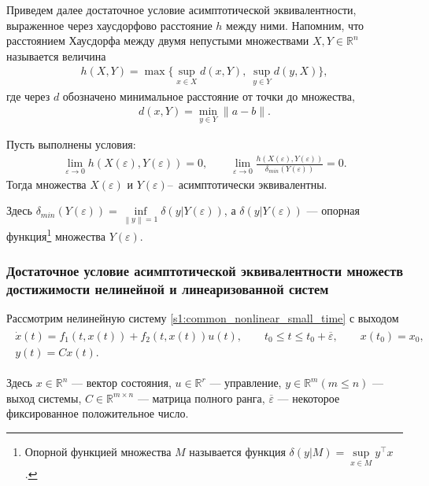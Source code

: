 \documentclass[../main.tex]{subfiles}
\begin{document}
Приведем далее достаточное условие асимптотической эквивалентности, выраженное через хаусдорфово расстояние $ h $ между ними. 
Напомним, что расстоянием Хаусдорфа между двумя непустыми множествами $X, Y \in \mathbb{R}^n$ называется величина 
\begin{gather*}
	h(X,Y) = \max\Big\{ \sup\limits_{x \in X} d(x, Y), \ \sup\limits_{y \in Y} d(y, X) \Big\},
\end{gather*}
где через $d$ обозначено минимальное расстояние от точки до множества, 
\begin{gather*}
	d(x, Y) = \min\limits_{y \in Y} \| a - b\|.
\end{gather*} 
\begin{theorem}\label{suff}\cite{GusevUMJ}
 Пусть выполнены условия:
 \begin{gather*}
 \lim\limits_{\varepsilon \rightarrow 0}h(X(\varepsilon),Y(\varepsilon)) = 0, \qquad \lim\limits_{\varepsilon \rightarrow 0}\frac{h(X(\varepsilon),Y(\varepsilon))}{\delta_{min}(Y(\varepsilon))} = 0.
 \end{gather*}
 Тогда множества $ X(\varepsilon) $ и $ Y(\varepsilon) $\---~асимптотически эквивалентны. 
 
 Здесь $ \delta_{min}(Y(\varepsilon)) = \inf\limits_{\left\|y \right\| =1 } \delta(y|Y(\varepsilon))$, а $ \delta(y|Y(\varepsilon)) $ --- опорная функция\footnote{
 Опорной функцией множества $M$ называется функция $\delta(y|M) = \sup\limits_{x \in M} y^{\top} x$. 
 } множества $ Y(\varepsilon) $.
\end{theorem}
\subsubsection{Достаточное условие асимптотической эквивалентности множеств достижимости нелинейной и линеаризованной систем}
 Рассмотрим нелинейную систему \eqref{s1:common_nonlinear_small_time} с выходом
\begin{gather}\label{s2:nonlinear_with_output}
 \begin{gathered}
 \dot{x}(t)=f_1(t,x(t))+f_2(t,x(t))u(t), \qquad t_0 \leqslant t \leqslant t_0 + \overline{\varepsilon}, \qquad x(t_0) = x_0, \\
 y(t) = C x(t).
 \end{gathered}
\end{gather}

Здесь $ x \in \mathbb{R}^n $ --- вектор состояния, $ u \in \mathbb{R}^r $ --- управление, $ y\in\mathbb{R}^m (m \leqslant n) $ --- выход системы,
$ C\in \mathbb{R}^{m \times n} $ --- матрица полного ранга, $ \overline{\varepsilon} $ --- некоторое фиксированное положительное число.
\end{document}
